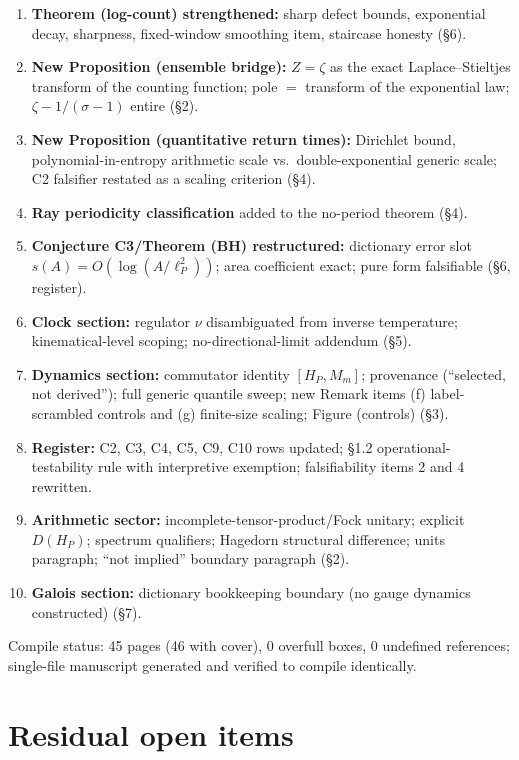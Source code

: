 \documentclass[11pt,a4paper]{article}
\begin{document}
\begin{enumerate}[leftmargin=1.6em]
\item \textbf{Theorem (log-count) strengthened:} sharp defect bounds,
exponential decay, sharpness, fixed-window smoothing item, staircase honesty
(\S6).
\item \textbf{New Proposition (ensemble bridge):} $Z=\zeta$ as the exact
Laplace--Stieltjes transform of the counting function; pole $=$ transform of
the exponential law; $\zeta-1/(\sigma-1)$ entire (\S2).
\item \textbf{New Proposition (quantitative return times):} Dirichlet bound,
polynomial-in-entropy arithmetic scale vs.\ double-exponential generic scale;
C2 falsifier restated as a scaling criterion (\S4).
\item \textbf{Ray periodicity classification} added to the no-period theorem
(\S4).
\item \textbf{Conjecture C3/Theorem (BH) restructured:} dictionary error slot
$s(A)=O(\log(A/\ell_P^2))$; area coefficient exact; pure form falsifiable
(\S6, register).
\item \textbf{Clock section:} regulator $\nu$ disambiguated from inverse
temperature; kinematical-level scoping; no-directional-limit addendum (\S5).
\item \textbf{Dynamics section:} commutator identity $[H_P,M_m]$; provenance
(``selected, not derived''); full generic quantile sweep; new Remark items (f)
label-scrambled controls and (g) finite-size scaling; Figure (controls)
(\S3).
\item \textbf{Register:} C2, C3, C4, C5, C9, C10 rows updated; \S1.2
operational-testability rule with interpretive exemption; falsifiability
items 2 and 4 rewritten.
\item \textbf{Arithmetic sector:} incomplete-tensor-product/Fock unitary;
explicit $D(H_P)$; spectrum qualifiers; Hagedorn structural difference; units
paragraph; ``not implied'' boundary paragraph (\S2).
\item \textbf{Galois section:} dictionary bookkeeping boundary (no gauge
dynamics constructed) (\S7).
\end{enumerate}

Compile status: 45 pages (46 with cover), 0 overfull boxes, 0 undefined
references; single-file manuscript generated and verified to compile
identically.

\section{Residual open items}
\end{document}
